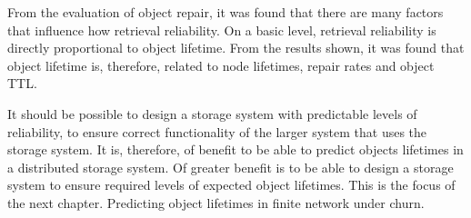 From the evaluation of object repair, it was found that there are many factors that influence how retrieval reliability. On a basic level, retrieval reliability is directly proportional to object lifetime. From the results shown, it was found that object lifetime is, therefore, related to node lifetimes, repair rates and object TTL.

It should be possible to design a storage system with predictable levels of reliability, to ensure correct functionality of the larger system that uses the storage system. It is, therefore, of benefit to be able to predict objects lifetimes in a distributed storage system. Of greater benefit is to be able to design a storage system to ensure required levels of expected object lifetimes. This is the focus of the next chapter. Predicting object lifetimes in finite network under churn.
